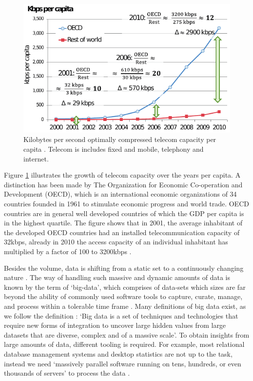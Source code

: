 \begin{figure}[ht!]
\centering
\includegraphics[width=\textwidth]{figures/kbpspercapita.pdf}
\caption[Telecom capacity per capita]{Kilobytes per second optimally compressed telecom capacity per capita \cite{SIGN:SIGN584}. Telecom is includes fixed and mobile, telephony and internet. \label{fig:growth}}
\end{figure}

Figure \ref{fig:growth} illustrates the growth of telecom capacity over the years per capita. A distinction has been made by The Organization for Economic Co-operation and Development (OECD), which is an international economic organizations of 34 countries founded in 1961 to stimulate economic progress and world trade. OECD countries are in general well developed countries of which the GDP per capita is in the highest quartile. The figure shows that in 2001, the average inhabitant of the developed OECD countries had an installed telecommunication capacity of 32kbps, already in 2010 the access capacity of an individual inhabitant has multiplied by a factor of 100 to 3200kbps \cite{SIGN:SIGN584}.

Besides the volume, data is shifting from a static set to a continuously changing nature \cite{1558609016}. The way of handling such massive and dynamic amounts of data is known by the term of `big-data', which comprises of data-sets which sizes are far beyond the ability of commonly used software tools to capture, curate, manage, and process within a tolerable time frame \cite{bigdata}. Many definitions of big data exist, as we follow the definition \cite{Hashem201598}: `Big data is a set of techniques and technologies that require new forms of integration to uncover large hidden values from large datasets that are diverse, complex and of a massive scale'. To obtain insights from large amounts of data, different tooling is required. For example, most relational database management systems and desktop statistics are not up to the task, instead we need `massively parallel software running on tens, hundreds, or even thousands of servers' to process the data \cite{Jacobs:2009:PBD:1536616.1536632}.

